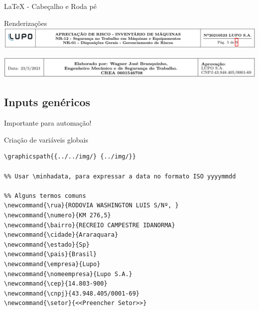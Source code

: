 \documentclass[bigger]{beamer}
\begin{document}
{\begin{frame}[label={sec:org755078d}]{\LaTeX{} - Cabeçalho e Roda pé}
\begin{block}{Renderizações}
\href{img/header.png}{\includegraphics[width=\textwidth]{./img/header.png}}
\vspace{1mm}

\small\lipsum[2]

\vspace{1mm}

\href{img/header.png}{\includegraphics[width=\textwidth]{./img/footer.png}}
\end{block}
\end{frame}

\subsection{Inputs genéricos}
\label{sec:org71ee761}
\begin{frame}[label={sec:org9982e82},fragile]{Importante para automação!}
 \begin{block}{Criação de variáveis globais}
\begin{verbatim}
\graphicspath{{../../img/} {../img/}}

%% Usar \minhadata, para expressar a data no formato ISO yyyymmdd 

%% Alguns termos comuns
\newcommand{\rua}{RODOVIA WASHINGTON LUIS S/Nº, }
\newcommand{\numero}{KM 276,5}
\newcommand{\bairro}{RECREIO CAMPESTRE IDANORMA}
\newcommand{\cidade}{Araraquara}
\newcommand{\estado}{Sp}
\newcommand{\pais}{Brasil}
\newcommand{\empresa}{Lupo}
\newcommand{\nomeempresa}{Lupo S.A.}
\newcommand{\cep}{14.803-900}
\newcommand{\cnpj}{43.948.405/0001-69}
\newcommand{\setor}{<<Preencher Setor>>}
\end{verbatim}
\end{block}
\end{frame}

}
\end{document}
